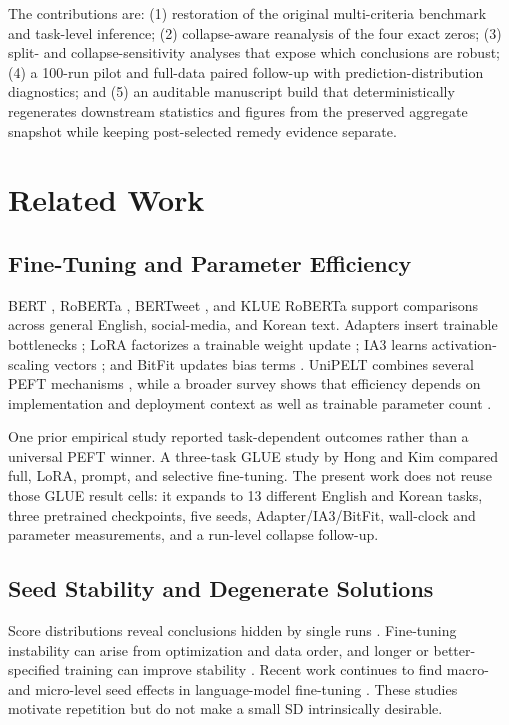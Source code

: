 \documentclass{SPC}
\begin{document}
The contributions are: (1) restoration of the original multi-criteria benchmark and task-level inference; (2) collapse-aware reanalysis of the four exact zeros; (3) split- and collapse-sensitivity analyses that expose which conclusions are robust; (4) a 100-run pilot and full-data paired follow-up with prediction-distribution diagnostics; and (5) an auditable manuscript build that deterministically regenerates downstream statistics and figures from the preserved aggregate snapshot while keeping post-selected remedy evidence separate.


\section{Related Work}

\subsection{Fine-Tuning and Parameter Efficiency}

BERT \cite{1}, RoBERTa \cite{2}, BERTweet \cite{3}, and KLUE RoBERTa \cite{4} support comparisons across general English, social-media, and Korean text. Adapters insert trainable bottlenecks \cite{5}; LoRA factorizes a trainable weight update \cite{6}; IA3 learns activation-scaling vectors \cite{7}; and BitFit updates bias terms \cite{8}. UniPELT combines several PEFT mechanisms \cite{20}, while a broader survey shows that efficiency depends on implementation and deployment context as well as trainable parameter count \cite{21}.

One prior empirical study reported task-dependent outcomes rather than a universal PEFT winner. A three-task GLUE study by Hong and Kim \cite{23} compared full, LoRA, prompt, and selective fine-tuning. The present work does not reuse those GLUE result cells: it expands to 13 different English and Korean tasks, three pretrained checkpoints, five seeds, Adapter/IA3/BitFit, wall-clock and parameter measurements, and a run-level collapse follow-up.

\subsection{Seed Stability and Degenerate Solutions}

Score distributions reveal conclusions hidden by single runs \cite{9}. Fine-tuning instability can arise from optimization and data order, and longer or better-specified training can improve stability \cite{10,17,18}. Recent work continues to find macro- and micro-level seed effects in language-model fine-tuning \cite{19}. These studies motivate repetition but do not make a small SD intrinsically desirable.
\end{document}
